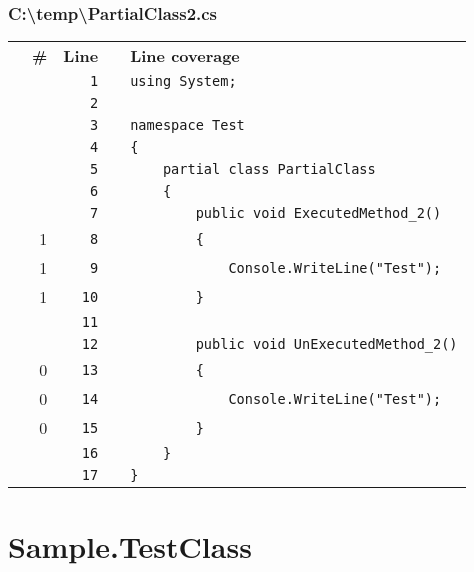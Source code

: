 \documentclass[a4paper,landscape,10pt]{article}
\begin{document}
\subsubsection{C:\textbackslash temp\textbackslash PartialClass2.cs}
\begin{longtable}[l]{lrrll}
\textbf{} & \textbf{\#} & \textbf{Line} & \textbf{} & \textbf{Line coverage}\\
\cellcolor{gray} &  & \verb~1~ & & \verb~using System;~\\
\cellcolor{gray} &  & \verb~2~ & & \verb~~\\
\cellcolor{gray} &  & \verb~3~ & & \verb~namespace Test~\\
\cellcolor{gray} &  & \verb~4~ & & \verb~{~\\
\cellcolor{gray} &  & \verb~5~ & & \verb~    partial class PartialClass~\\
\cellcolor{gray} &  & \verb~6~ & & \verb~    {~\\
\cellcolor{gray} &  & \verb~7~ & & \verb~        public void ExecutedMethod_2()~\\
\cellcolor{green} & 1 & \verb~8~ & & \verb~        {~\\
\cellcolor{green} & 1 & \verb~9~ & & \verb~            Console.WriteLine("Test");~\\
\cellcolor{green} & 1 & \verb~10~ & & \verb~        }~\\
\cellcolor{gray} &  & \verb~11~ & & \verb~~\\
\cellcolor{gray} &  & \verb~12~ & & \verb~        public void UnExecutedMethod_2()~\\
\cellcolor{red} & 0 & \verb~13~ & & \verb~        {~\\
\cellcolor{red} & 0 & \verb~14~ & & \verb~            Console.WriteLine("Test");~\\
\cellcolor{red} & 0 & \verb~15~ & & \verb~        }~\\
\cellcolor{gray} &  & \verb~16~ & & \verb~    }~\\
\cellcolor{gray} &  & \verb~17~ & & \verb~}~\\
\end{longtable}
\newpage
\section{Sample.TestClass}
\end{document}

